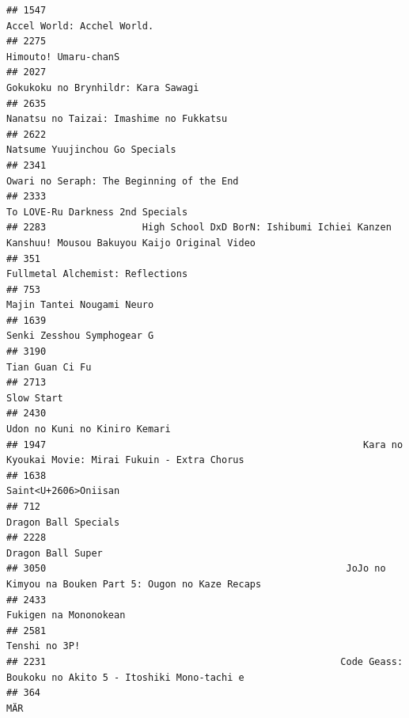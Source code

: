 \documentclass[
]{article}
\begin{document}
\begin{verbatim}
## 1547                                                                                Accel World: Acchel World.
## 2275                                                                                      Himouto! Umaru-chanS
## 2027                                                                        Gokukoku no Brynhildr: Kara Sawagi
## 2635                                                                   Nanatsu no Taizai: Imashime no Fukkatsu
## 2622                                                                            Natsume Yuujinchou Go Specials
## 2341                                                                 Owari no Seraph: The Beginning of the End
## 2333                                                                          To LOVE-Ru Darkness 2nd Specials
## 2283                 High School DxD BorN: Ishibumi Ichiei Kanzen Kanshuu! Mousou Bakuyou Kaijo Original Video
## 351                                                                           Fullmetal Alchemist: Reflections
## 753                                                                                 Majin Tantei Nougami Neuro
## 1639                                                                                Senki Zesshou Symphogear G
## 3190                                                                                           Tian Guan Ci Fu
## 2713                                                                                                Slow Start
## 2430                                                                             Udon no Kuni no Kiniro Kemari
## 1947                                                        Kara no Kyoukai Movie: Mirai Fukuin - Extra Chorus
## 1638                                                                                      Saint<U+2606>Oniisan
## 712                                                                                       Dragon Ball Specials
## 2228                                                                                         Dragon Ball Super
## 3050                                                     JoJo no Kimyou na Bouken Part 5: Ougon no Kaze Recaps
## 2433                                                                                     Fukigen na Mononokean
## 2581                                                                                             Tenshi no 3P!
## 2231                                                    Code Geass: Boukoku no Akito 5 - Itoshiki Mono-tachi e
## 364                                                                                                        MÄR

\end{verbatim}
\end{document}
